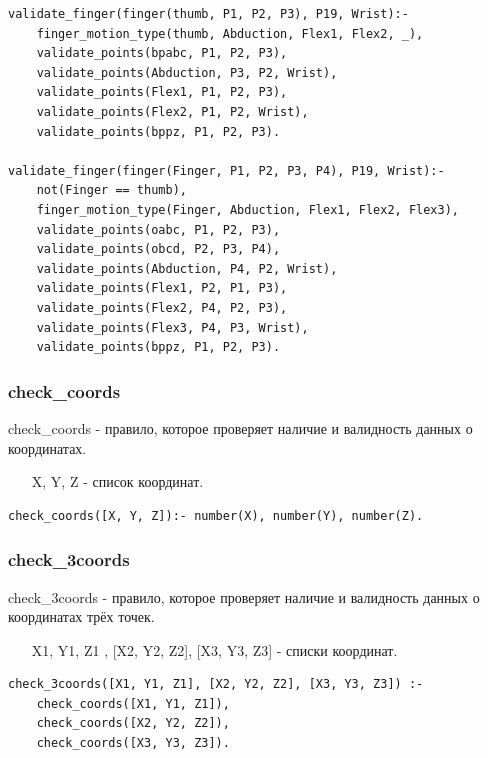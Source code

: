 \begin{lstlisting}[caption=Реализация правила validate\_finger, label=rules:validatefinger]
validate_finger(finger(thumb, P1, P2, P3), P19, Wrist):-
	finger_motion_type(thumb, Abduction, Flex1, Flex2, _),
	validate_points(bpabc, P1, P2, P3),
	validate_points(Abduction, P3, P2, Wrist),
	validate_points(Flex1, P1, P2, P3),
	validate_points(Flex2, P1, P2, Wrist),
	validate_points(bppz, P1, P2, P3).
	
validate_finger(finger(Finger, P1, P2, P3, P4), P19, Wrist):-
	not(Finger == thumb),
	finger_motion_type(Finger, Abduction, Flex1, Flex2, Flex3),
	validate_points(oabc, P1, P2, P3),
	validate_points(obcd, P2, P3, P4),
	validate_points(Abduction, P4, P2, Wrist),
	validate_points(Flex1, P2, P1, P3),
	validate_points(Flex2, P4, P2, P3),
	validate_points(Flex3, P4, P3, Wrist),
	validate_points(bppz, P1, P2, P3).
\end{lstlisting}

\subsubsection{check\_coords}
\hspace{0.6cm} check\_coords - правило, которое проверяет наличие и валидность данных о координатах.

\begin{itemize}
	\item [X, Y, Z] - список координат.
\end{itemize}

\begin{lstlisting}[caption=Реализация правила check\_coords, label=rules:checkcoords]
check_coords([X, Y, Z]):- number(X), number(Y), number(Z).
\end{lstlisting}

\subsubsection{check\_3coords}
\hspace{0.6cm} check\_3coords - правило, которое проверяет наличие и валидность данных о координатах трёх точек.

\begin{itemize}
	\item [X1, Y1, Z1], [X2, Y2, Z2], [X3, Y3, Z3] - списки координат.
\end{itemize}

\begin{lstlisting}[caption=Реализация правила check\_3coords, label=rules:check3coords]
check_3coords([X1, Y1, Z1], [X2, Y2, Z2], [X3, Y3, Z3]) :-
	check_coords([X1, Y1, Z1]),
	check_coords([X2, Y2, Z2]),
	check_coords([X3, Y3, Z3]).
\end{lstlisting}

